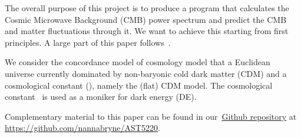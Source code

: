 





The overall purpose of this project is to produce a program that calculates the Cosmic Microwave Background (CMB) power spectrum and predict the CMB and matter fluctuations through it. We want to achieve this starting from first principles. A large part of this paper follows~\citet{Callin2006}.

We consider the concordance model of cosmology model that a Euclidean universe currently dominated by non-baryonic cold dark matter (CDM) and a cosmological constant (\textLambda), namely the (flat) \textLambda CDM model. The cosmological constant \textLambda\, is used as a moniker for dark energy (DE).~\citep{DodelsonBook}

Complementary material to this paper can be found in our~\href{https://github.com/nannabryne/AST5220}{Github repository} at \url{https://github.com/nannabryne/AST5220}.